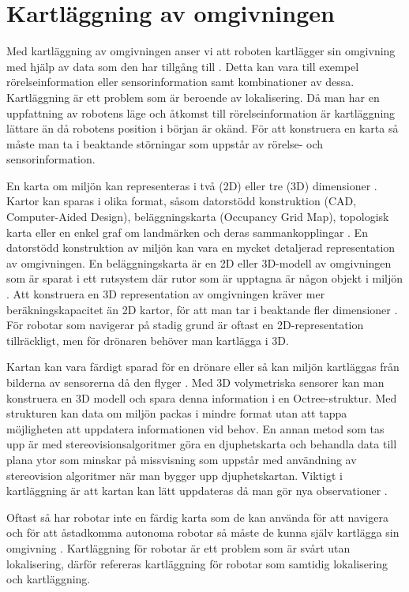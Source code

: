 \section{Kartläggning av omgivningen}

Med kartläggning av omgivningen anser vi att roboten kartlägger sin omgivning med hjälp av data som den har tillgång till \citep{ProbabilisticRobotics}. Detta kan vara till exempel rörelseinformation eller sensorinformation samt kombinationer av dessa. Kartläggning är ett problem som är beroende av lokalisering. Då man har en uppfattning av robotens läge och åtkomst till rörelseinformation är kartläggning lättare än då robotens position i början är okänd. För att konstruera en karta så måste man ta i beaktande störningar som uppstår av rörelse- och sensorinformation.

En karta om miljön kan representeras i två (2D) eller tre (3D) dimensioner \citep{geospatial}. Kartor kan sparas i olika format, såsom datorstödd konstruktion (CAD, Computer-Aided Design), beläggningskarta (Occupancy Grid Map), topologisk karta eller en enkel graf om landmärken och deras sammankopplingar \citep{982903}. En datorstödd konstruktion av miljön kan vara en mycket detaljerad representation av omgivningen. En beläggningskarta är en 2D eller 3D-modell av omgivningen som är sparat i ett rutsystem där rutor som är upptagna är någon objekt i miljön \citep{6095058, 982903}. Att konstruera en 3D representation av omgivningen kräver mer beräkningskapacitet än 2D kartor, för att man tar i beaktande fler dimensioner \citep{ProbabilisticRobotics}. För robotar som navigerar på stadig grund är oftast en 2D-representation tillräckligt, men för drönaren behöver man kartlägga i 3D.

Kartan kan vara färdigt sparad för en drönare eller så kan miljön kartläggas från bilderna av sensorerna då den flyger \citep{geospatial}. Med 3D volymetriska sensorer kan man konstruera en 3D modell och spara denna information i en Octree-struktur. Med strukturen kan data om miljön packas i mindre format utan att tappa möjligheten att uppdatera informationen vid behov. En annan metod som tas upp är med stereovisionsalgoritmer göra en djuphetskarta och behandla data till plana ytor som minskar på missvisning som uppstår med användning av stereovision algoritmer när man bygger upp djuphetskartan. Viktigt i kartläggning är att kartan kan lätt uppdateras då man gör nya observationer \citep{globalsubmaps}.

Oftast så har robotar inte en färdig karta som de kan använda för att navigera och för att åstadkomma autonoma robotar så måste de kunna själv kartlägga sin omgivning \citep{ProbabilisticRobotics}. Kartläggning för robotar är ett problem som är svårt utan lokalisering, därför refereras kartläggning för robotar som samtidig lokalisering och kartläggning. 

